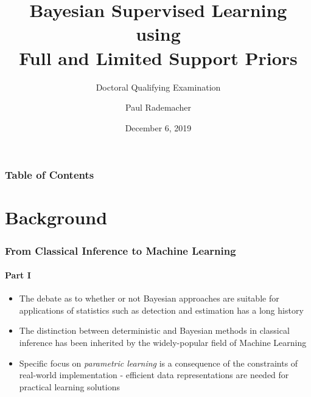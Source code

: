 \documentclass[aspectratio=169,usenames,dvipsnames]{beamer}
\title[Bayesian Supervised Learning]{Bayesian Supervised Learning using \\Full and Limited Support Priors}
\subtitle{Doctoral Qualifying Examination}
\author[Rademacher]{Paul Rademacher}
\institute[GWU] 
{
  The George Washington University\\Department of Electrical and Computer Engineering
}
\date{December 6, 2019}
\begin{document}


\begin{frame}
\titlepage
\end{frame}


\begin{frame}
    \frametitle{Table of Contents}
    \tableofcontents
\end{frame}




\section{Background}


\begin{frame}
\frametitle{From Classical Inference to Machine Learning}
\framesubtitle{Part I}

\begin{itemize}
\item The debate as to whether or not Bayesian approaches are suitable for applications of statistics such as detection and estimation has a long history \cite{box}
\vspace{0.5em}
\item The distinction between deterministic and Bayesian methods in classical inference has been inherited by the widely-popular field of \alert{Machine Learning}
\vspace{0.5em}
\item Specific focus on \emph{parametric learning} is a consequence of the constraints of real-world implementation - efficient data representations are needed for practical learning solutions


\end{itemize}

\end{frame}
\end{document}
